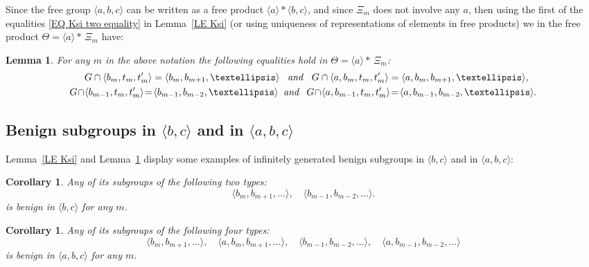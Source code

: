 \documentclass[12pt, a4paper]{amsart}
\newcommand{\1}{\{1\}}
\theoremstyle{plain}
\newtheorem{Lemma}[Theorem]{Lemma}
\newtheorem{Corollary}[Theorem]{Corollary}
\theoremstyle{definition}
\theoremstyle{remark}
\numberwithin{equation}{section}
\begin{document}
Since the free group $\langle a,b,c \rangle$ can be written as a free product $\langle a \rangle * \langle b,c \rangle$, and since $\Xi_m$ does not involve any $a$, then
using the first of the equalities \eqref{EQ Ksi two equality} in Lemma~\ref{LE Ksi} (or using uniqueness of representations of elements in free products)
we in the free product $\Theta=\langle a \rangle * \,\Xi_m$ have: 

\begin{Lemma}
\label{LE Ksi for G}
For any $m$ in the above notation the following equalities hold in $\Theta=\langle a \rangle * \,\Xi_m$:
\begin{equation}
\label{EQ a simple example of bening subgroup}
\begin{split}
G \cap \langle b_m, t_m, t'_m\rangle = \langle b_m, b_{m+1},\ldots\rangle
\;\;\; {\it and} \;\;\;  
G \cap \langle a, b_m, t_m, t'_m\rangle = \langle a, b_m, b_{m+1},\ldots\rangle,
\hskip3mm \\
%
G \! \cap \!\langle b_{m-1}, t_m, t'_m\rangle  \! =  \! \langle b_{m-1}, b_{m-2},\ldots\rangle
\;\; {\it and} \;\;\,  
G \! \cap \! \langle a, b_{m-1}, t_m, t'_m\rangle \!  =  \! \langle a, b_{m-1}, b_{m-2},\ldots\rangle.
\end{split}
\end{equation}
\end{Lemma}

\subsection{Benign subgroups in $\langle b,c \rangle$ and in $\langle a, b,c \rangle$}
\label{SU Benign subgroups in b c and a b c} 

Lemma~\ref{LE Ksi} and Lemma~\ref{LE Ksi for G} display some examples of infinitely generated benign subgroups in $\langle b,c \rangle$ and in $\langle a, b,c \rangle$:

\begin{Corollary}
\label{CO two types of benign subgruops in <b,c>}
Any of its subgroups of the following two types:
$$
\langle b_m, b_{m+1},\ldots\rangle,
\quad
\langle b_{m-1}, b_{m-2},\ldots\rangle.
$$
is benign in $\langle b,c \rangle$ for any $m$.
\end{Corollary}


\begin{Corollary}
\label{CO four types of benign subgruops in G}
Any of its subgroups of  the following  four types:
$$
\langle b_m, b_{m+1},\ldots\rangle,
\quad
\langle a, b_m, b_{m+1},\ldots\rangle,
\quad
\langle b_{m-1}, b_{m-2},\ldots\rangle,
\quad
\langle a, b_{m-1}, b_{m-2},\ldots\rangle
$$
is benign in $\langle a,b,c \rangle$ for any $m$.
\end{Corollary}
\end{document}
